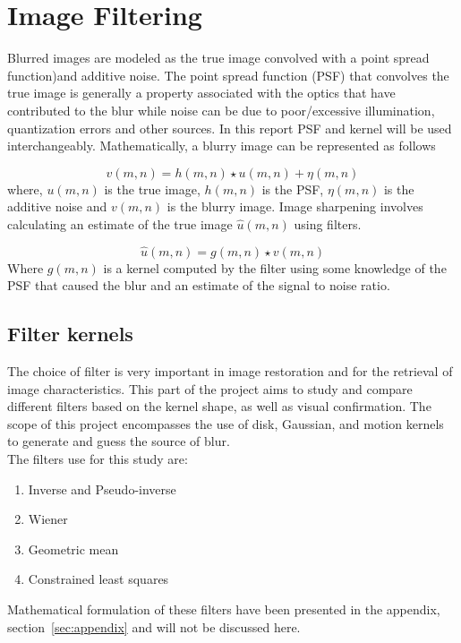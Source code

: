 \graphicspath{{mehul_pics/}}%

\section{Image Filtering}

Blurred images are modeled as the true image convolved with a point spread function)and additive noise. The point spread function (PSF) that convolves the true image is generally a property associated with the optics that have contributed to the blur while noise can be due to poor/excessive illumination, quantization errors and other sources. In this report PSF and kernel will be used interchangeably. Mathematically, a blurry image can be represented as follows

\begin{equation}
v(m,n)= h(m,n) \star u(m,n) + \eta(m,n)
\end{equation}
where, $u(m,n)$ is the true image, $h(m,n)$ is the PSF, $\eta(m,n)$ is the additive noise and $v(m,n)$ is the blurry image. Image sharpening involves calculating an estimate of the true image $\hat{u}(m,n)$ using filters.

\begin{equation}
\hat{u}(m,n)= g(m,n) \star v(m,n)
\end{equation}
Where $g(m,n)$ is a kernel computed by the filter using some knowledge of the PSF that caused the blur and an estimate of the signal to noise ratio.

\subsection{Filter kernels}
The choice of filter is very important in image restoration and for the retrieval of image characteristics. This part of the project aims to study and compare different filters based on the kernel shape, as well as visual confirmation. The scope of this project encompasses the use of disk, Gaussian, and motion kernels to generate and guess the source of blur.\\

The filters use for this study are: 
\begin{enumerate}
\item Inverse and Pseudo-inverse
\item Wiener
\item Geometric mean
\item Constrained least squares
\end{enumerate} 
Mathematical formulation of these filters have been presented in the appendix, section~\ref{sec:appendix} and will not be discussed here. 
